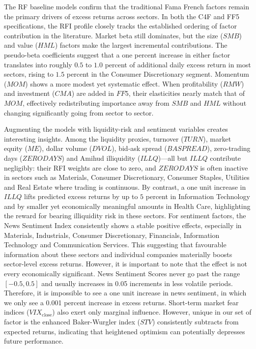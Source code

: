 \begin{landscape}




\end{landscape}


The RF baseline models confirm that the traditional Fama French factors remain the primary drivers of excess returns across sectors. In both the C4F and FF5 specifications, the RFI profile closely tracks the established ordering of factor contribution in the literature.  Market beta still dominates, but the size ($SMB$) and value ($HML$) factors make the largest incremental contributions. The pseudo-beta coefficients suggest that a one percent increase in either factor translates into roughly $0.5$ to $1.0$ percent of additional daily excess return in most sectors, rising to $1.5$ percent in the Consumer Discretionary segment. Momentum ($MOM$) shows a more modest yet systematic effect. When profitability ($RMW$) and investment ($CMA$) are added in $FF5$, their elasticities nearly match that of $MOM$, effectively redistributing importance away from $SMB$ and $HML$ without changing significantly going from sector to sector.

Augmenting the models with liquidity-risk and sentiment variables creates interesting insights. Among the liquidity proxies, turnover ($TURN$), market equity ($ME$), dollar volume ($DVOL$), bid-ask spread ($BASPREAD$), zero-trading days ($ZERODAYS$) and Amihud illiquidity ($ILLQ$)—all but $ILLQ$ contribute negligibly: their RFI weights are close to zero, and $ZERODAYS$ is often inactive in sectors such as Materials, Consumer Discretionary, Consumer Staples, Utilities and Real Estate where trading is continuous. By contrast, a one unit increase in $ILLQ$ lifts predicted excess returns by up to $5$ percent in Information Technology and by smaller yet economically meaningful amounts in Health Care, highlighting the reward for bearing illiquidity risk in these sectors. For sentiment factors, the News Sentiment Index consistently shows a stable positive effects, especially in Materials, Industrials, Consumer Discretionary, Financials, Information Technology and Communication Services. This suggesting that favourable information about these sectors and individual companies materially boosts sector-level excess returns. However, it is important to note that the effect is not every economically significant. News Sentiment Scores never go past the range $[-0.5, 0.5]$ and usually increases in 0.05 increments in less volatile periods. Therefore, it is impossible to see a one unit increase in news sentiment, in which we only see a 0.001 percent increase in excess returns. Short-term market fear indices ($VIX_{\text{close}}$) also exert only marginal influence. However, unique in our set of factor is the  enhanced Baker-Wurgler index ($STV$) consistently subtracts from expected returns, indicating that heightened optimism can potentially depresses future performance. 


